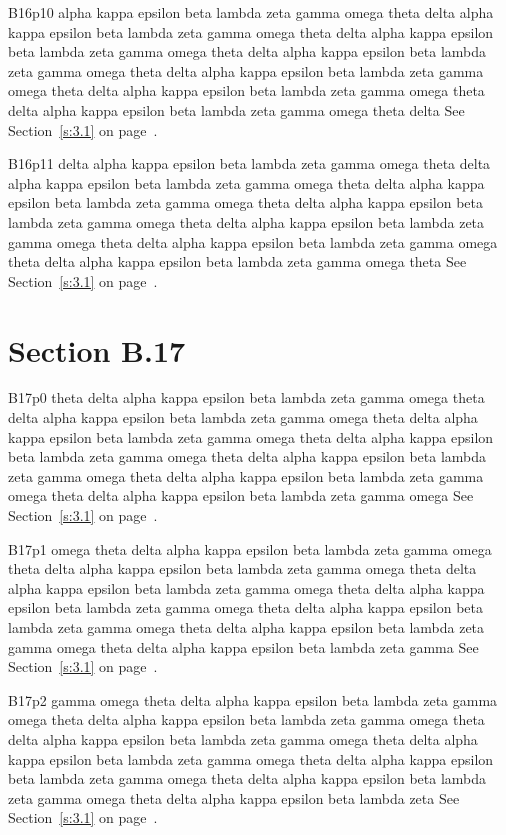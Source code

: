 B16p10 alpha kappa epsilon beta lambda zeta gamma omega theta delta alpha kappa epsilon beta lambda zeta gamma omega theta delta alpha kappa epsilon beta lambda zeta gamma omega theta delta alpha kappa epsilon beta lambda zeta gamma omega theta delta alpha kappa epsilon beta lambda zeta gamma omega theta delta alpha kappa epsilon beta lambda zeta gamma omega theta delta alpha kappa epsilon beta lambda zeta gamma omega theta delta See Section~\ref{s:3.1} on page~\pageref{s:3.1}.

B16p11 delta alpha kappa epsilon beta lambda zeta gamma omega theta delta alpha kappa epsilon beta lambda zeta gamma omega theta delta alpha kappa epsilon beta lambda zeta gamma omega theta delta alpha kappa epsilon beta lambda zeta gamma omega theta delta alpha kappa epsilon beta lambda zeta gamma omega theta delta alpha kappa epsilon beta lambda zeta gamma omega theta delta alpha kappa epsilon beta lambda zeta gamma omega theta See Section~\ref{s:3.1} on page~\pageref{s:3.1}.

\section{Section B.17}\label{s:B.17}
B17p0 theta delta alpha kappa epsilon beta lambda zeta gamma omega theta delta alpha kappa epsilon beta lambda zeta gamma omega theta delta alpha kappa epsilon beta lambda zeta gamma omega theta delta alpha kappa epsilon beta lambda zeta gamma omega theta delta alpha kappa epsilon beta lambda zeta gamma omega theta delta alpha kappa epsilon beta lambda zeta gamma omega theta delta alpha kappa epsilon beta lambda zeta gamma omega See Section~\ref{s:3.1} on page~\pageref{s:3.1}.

B17p1 omega theta delta alpha kappa epsilon beta lambda zeta gamma omega theta delta alpha kappa epsilon beta lambda zeta gamma omega theta delta alpha kappa epsilon beta lambda zeta gamma omega theta delta alpha kappa epsilon beta lambda zeta gamma omega theta delta alpha kappa epsilon beta lambda zeta gamma omega theta delta alpha kappa epsilon beta lambda zeta gamma omega theta delta alpha kappa epsilon beta lambda zeta gamma See Section~\ref{s:3.1} on page~\pageref{s:3.1}.

B17p2 gamma omega theta delta alpha kappa epsilon beta lambda zeta gamma omega theta delta alpha kappa epsilon beta lambda zeta gamma omega theta delta alpha kappa epsilon beta lambda zeta gamma omega theta delta alpha kappa epsilon beta lambda zeta gamma omega theta delta alpha kappa epsilon beta lambda zeta gamma omega theta delta alpha kappa epsilon beta lambda zeta gamma omega theta delta alpha kappa epsilon beta lambda zeta See Section~\ref{s:3.1} on page~\pageref{s:3.1}.

